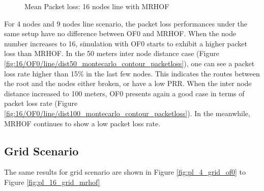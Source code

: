 \begin{figure}[htbp]
  \centering
    \leavevmode
  \caption{Mean Packet loss: 16 nodes line with MRHOF}
 \label{fig:pl_16_line_mrhof}
\end{figure}

For 4 nodes and 9 nodes line scenario, the packet loss performances under the same setup have no difference between OF0 and MRHOF. When the node number increases to 16, simulation with OF0 starts to exhibit a higher packet loss than MRHOF. In the 50 meters inter node distance case (Figure \ref{fig:16/OF0/line/dist50_montecarlo_contour_packetloss}), one can see a packet loss rate higher than 15\% in the last few nodes. This indicates the routes between the root and the nodes either broken, or have a low PRR. When the inter node distance increased to 100 meters, OF0 presents again a good case in terms of packet loss rate (Figure \ref{fig:16/OF0/line/dist100_montecarlo_contour_packetloss}). In the meanwhile, MRHOF continues to show a low packet loss rate.   
\newline 

\subsection{Grid Scenario}
\label{grid}
The same results for grid scenario are shown in Figure \ref{fig:pl_4_grid_of0} to Figure \ref{fig:pl_16_grid_mrhof}

